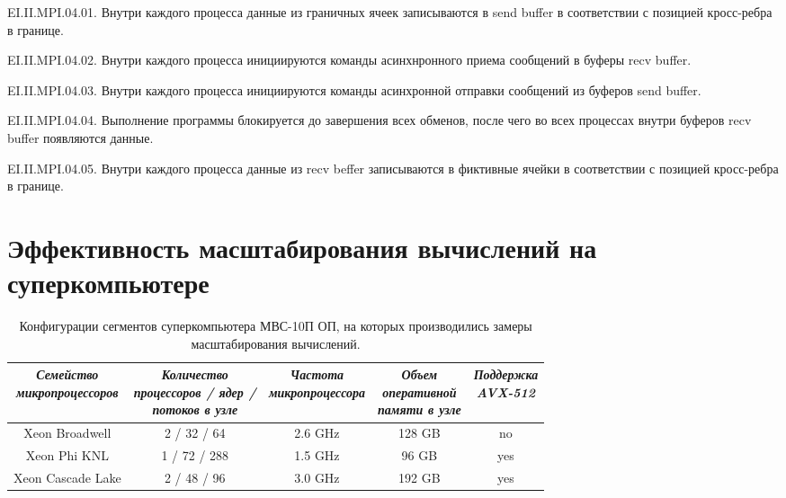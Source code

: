 \documentclass[
11pt,%
tightenlines,%
twoside,%
onecolumn,%
nofloats,%
nobibnotes,%
nofootinbib,%
superscriptaddress,%
noshowpacs,%
centertags]%
{revtex4}
\begin{document}
 EI.II.MPI.04.01. Внутри каждого процесса данные из граничных ячеек записываются в send buffer в соответствии с позицией кросс-ребра в границе.

 EI.II.MPI.04.02. Внутри каждого процесса инициируются команды асинхнронного приема сообщений в буферы recv buffer.

 EI.II.MPI.04.03. Внутри каждого процесса инициируются команды асинхронной отправки сообщений из буферов send buffer.

 EI.II.MPI.04.04. Выполнение программы блокируется до завершения всех обменов, после чего во всех процессах внутри буферов recv buffer появляются данные.

 EI.II.MPI.04.05. Внутри каждого процесса данные из recv beffer записываются в фиктивные ячейки в соответствии с позицией кросс-ребра в границе.

\section{Эффективность масштабирования вычислений на суперкомпьютере}

\begin{table}[!h]
\label{tbl:supercomputers}
\setcaptionmargin{0mm}
\onelinecaptionsfalse
{}
\caption{Конфигурации сегментов суперкомпьютера МВС-10П ОП, на которых производились замеры масштабирования вычислений.}
\bigskip
\begin{tabular}{|c|c|c|c|c|}
\hline
\parbox{3.5cm}{\textit{Семейство\\микропроцессоров}} & \parbox{4.0cm}{\textit{Количество\\процессоров / ядер /\\потоков в узле}} & \parbox{3.5cm}{\textit{Частота\\микропроцессора}} & \parbox{3.0cm}{\textit{Объем\\оперативной\\памяти в узле}} & \parbox{2.5cm}{\textit{Поддержка\\AVX-512}} \\
\hline
Xeon Broadwell & 2 / 32 / 64 & 2.6 GHz & 128 GB & no \\
\hline
Xeon Phi KNL & 1 / 72 / 288 & 1.5 GHz & 96 GB & yes \\
\hline
Xeon Cascade Lake & 2 / 48 / 96 & 3.0 GHz & 192 GB & yes \\
\hline
\end{tabular}
\label{tab:supercomputers}
\end{table}   
\end{document}
